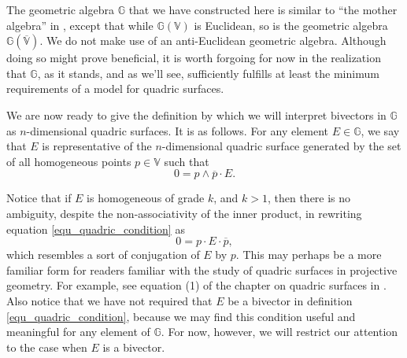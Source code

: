 \documentclass{birkjour}
\theoremstyle{definition}
\theoremstyle{remark}
\numberwithin{equation}{section}
\newcommand{\G}{\mathbb{G}}
\newcommand{\V}{\mathbb{V}}
\begin{document}
The geometric algebra $\G$ that we have constructed here is similar to ``the mother algebra''
in \cite{DoranHestenes93}, except that while $\G(\V)$
is Euclidean, so is the geometric algebra $\G(\overline{\V})$.  We do not
make use of an anti-Euclidean geometric algebra.  Although doing so might prove beneficial,
it is worth forgoing for now in the realization that $\G$, as it stands, and as we'll see, sufficiently
fulfills at least the minimum requirements of a model for quadric surfaces.

We are now ready to give the definition by which we will interpret bivectors in $\G$
as $n$-dimensional quadric surfaces.  It is as follows.
For any element $E\in\G$, we say that $E$ is representative of the $n$-dimensional
quadric surface generated by the set of all homogeneous points $p\in\V$ such that
\begin{equation}\label{equ_quadric_condition}
0 = p\wedge\overline{p}\cdot E.
\end{equation}

Notice that if $E$ is homogeneous of grade $k$, and $k>1$, then there is no ambiguity,
despite the non-associativity of the inner product, in rewriting equation
\eqref{equ_quadric_condition} as
\begin{equation}
0 = p\cdot E\cdot\overline{p},
\end{equation}
which resembles a sort of conjugation of $E$ by $p$.  This may perhaps be a more
familiar form for readers familiar with the study of quadric surfaces in projective geometry.
For example, see equation (1) of the chapter on quadric surfaces in \cite{MehlhornYap04}.
Also notice that we have not required that $E$ be a bivector in definition \eqref{equ_quadric_condition},
because we may find this condition useful and meaningful for any element of $\G$.  For now,
however, we will restrict our attention to the case when $E$ is a bivector.
\end{document}
